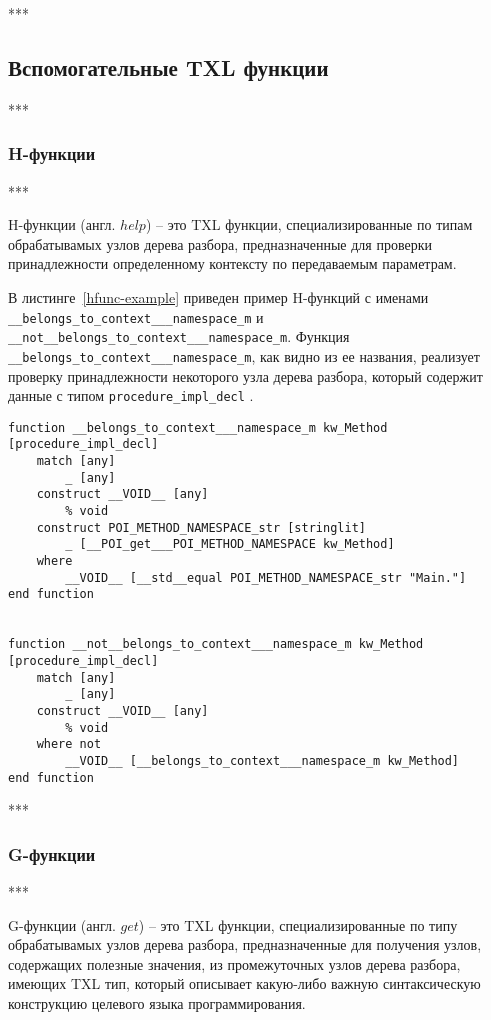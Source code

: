 ***

\subsection{Вспомогательные TXL функции}

***

\subsubsection{H-функции}

***

H-функции (англ. $help$) -- это TXL функции, специализированные по типам обрабатывамых узлов дерева разбора, предназначенные для проверки принадлежности определенному контексту по передаваемым параметрам.

В листинге~\ref{hfunc-example} приведен пример H-функций с именами \lstinline{__belongs_to_context___namespace_m} и \lstinline{__not__belongs_to_context___namespace_m}.
Функция \lstinline{__belongs_to_context___namespace_m}, как видно из ее названия, реализует проверку принадлежности некоторого узла дерева разбора, который содержит данные с типом \lstinline{procedure_impl_decl} .

\begin{lstlisting}[frame=single, language=TXL, label={hfunc-example}, caption={Пример H-функции}]
function __belongs_to_context___namespace_m kw_Method [procedure_impl_decl]
	match [any]
		_ [any]
	construct __VOID__ [any]
		% void
	construct POI_METHOD_NAMESPACE_str [stringlit]
		_ [__POI_get___POI_METHOD_NAMESPACE kw_Method]
	where
		__VOID__ [__std__equal POI_METHOD_NAMESPACE_str "Main."]
end function


function __not__belongs_to_context___namespace_m kw_Method [procedure_impl_decl]
	match [any]
		_ [any]
	construct __VOID__ [any]
		% void
	where not
		__VOID__ [__belongs_to_context___namespace_m kw_Method]
end function
\end{lstlisting}

***

\subsubsection{G-функции}

***

G-функции (англ. $get$) -- это TXL функции, специализированные по типу обрабатывамых узлов дерева разбора, предназначенные для получения узлов, содержащих полезные значения, из промежуточных узлов дерева разбора, имеющих TXL тип, который описывает какую-либо важную синтаксическую конструкцию целевого языка программирования.


